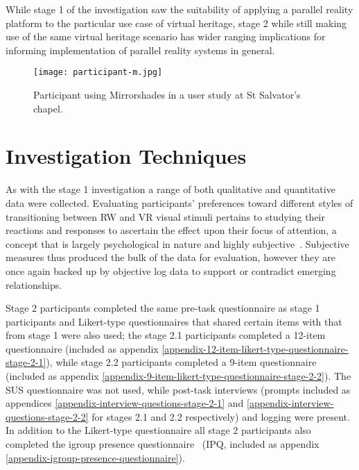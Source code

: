 While stage 1 of the investigation saw the suitability of applying a parallel reality platform to the particular use case of virtual heritage, stage 2 while still making use of the same virtual heritage scenario has wider ranging implications for informing implementation of parallel reality systems in general.

\begin{figure}[ht]
	\begin{center}
		\texttt{[image: participant-m.jpg]}
		\caption{Participant using Mirrorshades in a user study at St Salvator's chapel.}
		\label{participant-m.jpg}
	\end{center}
\end{figure}


\section{Investigation Techniques}

As with the stage 1 investigation a range of both qualitative and quantitative data were collected. Evaluating participants' preferences toward different styles of transitioning between RW and VR visual stimuli pertains to studying their reactions and responses to ascertain the effect upon their focus of attention, a concept that is largely psychological in nature and highly subjective~\cite{Ijsselsteijn2001}. Subjective measures thus produced the bulk of the data for evaluation, however they are once again backed up by objective log data to support or contradict emerging relationships.

Stage 2 participants completed the same pre-task questionnaire as stage 1 participants and Likert-type questionnaires that shared certain items with that from stage 1 were also used; the stage 2.1 participants completed a 12-item questionnaire (included as appendix \ref{appendix-12-item-likert-type-questionnaire-stage-2-1}), while stage 2.2 participants completed a 9-item questionnaire (included as appendix \ref{appendix-9-item-likert-type-questionnaire-stage-2-2}). The SUS questionnaire was not used, while post-task interviews (prompts included as appendices \ref{appendix-interview-questions-stage-2-1} and \ref{appendix-interview-questions-stage-2-2} for stages 2.1 and 2.2 respectively) and logging were present. In addition to the Likert-type questionnaire all stage 2 participants also completed the igroup presence questionnaire~\cite{Schubert2001} (IPQ, included as appendix \ref{appendix-igroup-presence-questionnaire}).

